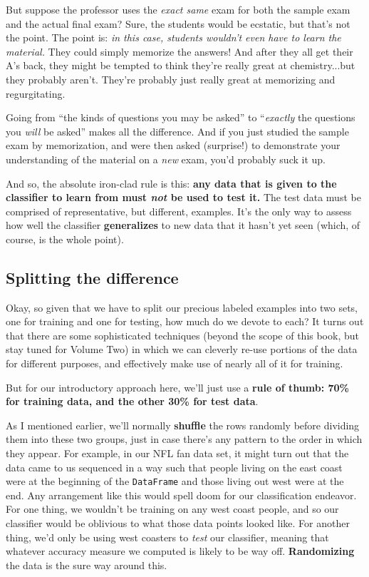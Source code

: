 But suppose the professor uses the \textit{exact same} exam for both the sample
exam and the actual final exam? Sure, the students would be ecstatic, but
that's not the point. The point is: \textit{in this case, students wouldn't
even have to learn the material.} They could simply memorize the answers! And
after they all get their A's back, they might be tempted to think they're
really great at chemistry...but they probably aren't. They're probably just
really great at memorizing and regurgitating.

Going from ``the kinds of questions you may be asked'' to ``\textit{exactly}
the questions you \textit{will} be asked'' makes all the difference. And if you
just studied the sample exam by memorization, and were then asked (surprise!)
to demonstrate your understanding of the material on a \textit{new} exam, you'd
probably suck it up.


And so, the absolute iron-clad rule is this: \textbf{any data that is given to
the classifier to learn from must \textit{not} be used to test it.} The test
data must be comprised of representative, but different, examples. It's the
only way to assess how well the classifier \textbf{generalizes} to new data
that it hasn't yet seen (which, of course, is the whole point).


\subsection{Splitting the difference}

Okay, so given that we have to split our precious labeled examples into two
sets, one for training and one for testing, how much do we devote to each? It
turns out that there are some sophisticated techniques (beyond the scope of
this book, but stay tuned for Volume Two) in which we can cleverly re-use
portions of the data for different purposes, and effectively make use of nearly
all of it for training.

But for our introductory approach here, we'll just use a \textbf{rule of thumb:
70\% for training data, and the other 30\% for test data}.

As I mentioned earlier, we'll normally \textbf{shuffle} the rows randomly
before dividing them into these two groups, just in case there's any pattern to
the order in which they appear. For example, in our NFL fan data set, it might
turn out that the data came to us sequenced in a way such that people living on
the east coast were at the beginning of the \texttt{DataFrame} and those living
out west were at the end. Any arrangement like this would spell doom for our
classification endeavor. For one thing, we wouldn't be training on any west
coast people, and so our classifier would be oblivious to what those data
points looked like. For another thing, we'd only be using west coasters to
\textit{test} our classifier, meaning that whatever accuracy measure we
computed is likely to be way off. \textbf{Randomizing} the data is the sure way
around this.

